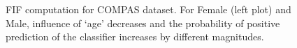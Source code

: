 \begin{figure}[t!]	
	\centering
	\vspace{-2ex}
	\caption{FIF computation for COMPAS dataset. For Female (left plot) and Male, influence of `age' decreases and the probability of positive prediction of the classifier increases  by different magnitudes.}\label{fvgm_fig:influence function}
\end{figure}



